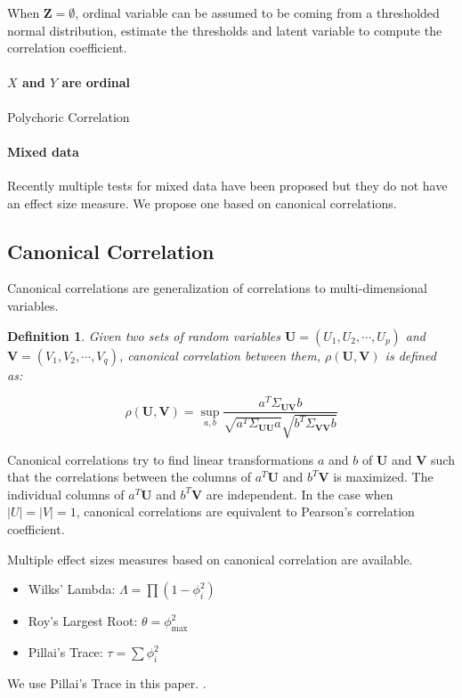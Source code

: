 \documentclass[letterpaper]{article} %
\newtheorem{definition}{Definition}
\begin{document}
When $ \bm{Z} = \emptyset $, ordinal variable can be assumed to be coming from a thresholded normal distribution, estimate the thresholds and latent variable to compute 
the correlation coefficient.

\paragraph{$ X $ and $ Y $ are ordinal}
Polychoric Correlation

\paragraph{Mixed data}
Recently multiple tests for mixed data have been proposed but they do not have
an effect size measure. We propose one based on canonical correlations.

\subsection{Canonical Correlation}
Canonical correlations are generalization of correlations to multi-dimensional variables.

\begin{definition}
	Given two sets of random variables $ \bm{U} = (U_1, U_2, \cdots, U_p) $
	and $ \bm{V} = (V_1, V_2, \cdots, V_q) $, canonical correlation between
	them, $\rho(\bm{U}, \bm{V}) $ is defined as:
		
	\begin{equation}
		\rho(\bm{U}, \bm{V}) = \sup_{a, b} \frac{a^T \Sigma_{\bm{U}\bm{V}} b}{\sqrt{a^T \Sigma_{\bm{U}\bm{U}} a} \sqrt{b^T \Sigma_{\bm{V}\bm{V}} b}}
	\end{equation}

\end{definition}
	
	Canonical correlations try to find linear transformations $ a $ and $ b
	$ of $ \bm{U} $ and $ \bm{V} $ such that the correlations between the
	columns of $ a^T \bm{U} $ and $ b^T \bm{V} $ is maximized. The
	individual columns of $ a^T \bm{U} $ and $ b^T \bm{V} $ are
	independent. In the case when $ \rvert U \rvert = \rvert V \rvert = 1$,
	canonical correlations are equivalent to Pearson's correlation
	coefficient.

Multiple effect sizes measures based on canonical correlation are available.
\begin{itemize}
	\item Wilks' Lambda: $ \Lambda = \prod (1 - \phi_i^2) $
	\item Roy's Largest Root: $ \theta = \phi_{\max}^2 $
	\item Pillai's Trace: $ \tau = \sum \phi_i^2 $
\end{itemize}
We use Pillai's Trace in this paper. .
\end{document}
